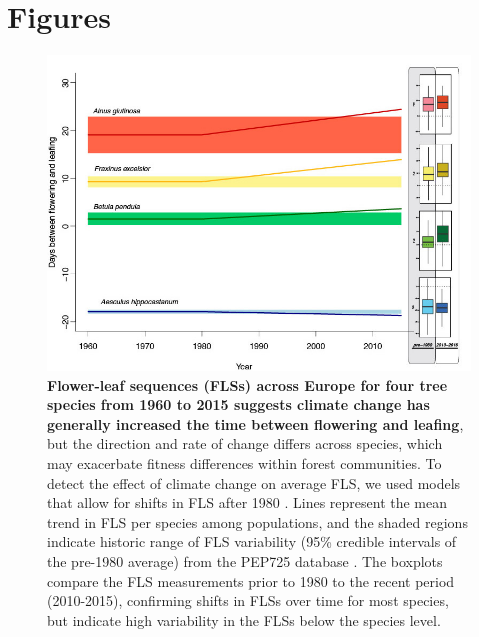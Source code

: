 \documentclass[11pt]{article}
\begin{document}
{\section*{Figures}


\begin{figure}[h!]
    \centering
 \includegraphics[width=\textwidth]{..//..//PEP725/FLS_climate_change_final.jpg}
    \caption{\textbf{Flower-leaf sequences (FLSs) across Europe for four tree species from 1960 to 2015 suggests climate change has generally increased the time between flowering and leafing}, but the direction and rate of change differs across species, which may exacerbate fitness differences within forest communities. To detect the effect of climate change on average FLS, we used models that allow for shifts in FLS after 1980 \citep{Kharouba2018}. Lines represent the mean trend in FLS per species among populations, and the shaded regions indicate historic range of FLS variability (95\% credible intervals of the pre-1980 average) from the PEP725 database \citep{PEP725}. The boxplots compare the FLS measurements prior to 1980 to the recent period (2010-2015), confirming shifts in FLSs over time for most species, but indicate high variability in the FLSs below the species level.}
    \label{fig:climchange}
\end{figure}

}
\end{document}
